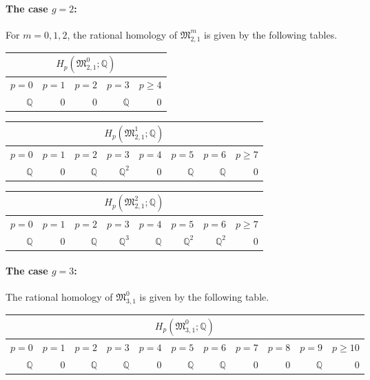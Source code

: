 \paragraph{The case \texorpdfstring{$g=2$}{g=2}:}
For $m = 0,1,2$, the rational homology of $\mathfrak M_{2,1}^m$ is given by the following tables.
\begin{center}
    \begin{tabular}{|r|r|r|r|r|}
        \hline
        \multicolumn{5}{|c|}{$H_p( \mathfrak{M}_{2,1}^0; \mathbb Q )$} \\ \hline
        $p=0$&$p=1$&$p=2$&$p=3$&$p\ge4$\\ \hline \hline
        $\mathbb Q$&$0$&$0$&$\mathbb Q$&$0$\\ \hline
    \end{tabular}
    
    \vspace{2.5ex}
    
    \begin{tabular}{|r|r|r|r|r|r|r|r|}
        \hline
        \multicolumn{8}{|c|}{$H_p( \mathfrak{M}_{2,1}^1; \mathbb Q )$} \\ \hline
        $p=0$&$p=1$&$p=2$&$p=3$&$p=4$&$p=5$&$p=6$&$p\ge7$\\ \hline \hline
        $\mathbb Q$&$0$&$\mathbb Q$&$\mathbb Q^2$&$0$&$\mathbb Q$&$\mathbb Q$&$0$\\ \hline
    \end{tabular}
    
    \vspace{2.5ex}
    
    \begin{tabular}{|r|r|r|r|r|r|r|r|}
        \hline
        \multicolumn{8}{|c|}{$H_p( \mathfrak{M}_{2,1}^2; \mathbb Q )$} \\ \hline
        $p=0$&$p=1$&$p=2$&$p=3$&$p=4$&$p=5$&$p=6$&$p\ge7$\\ \hline \hline
        $\mathbb Q$&$0$&$\mathbb Q$&$\mathbb Q^3$&$\mathbb Q$&$\mathbb Q^2$&$\mathbb Q^2$&$0$\\ \hline
    \end{tabular}
\end{center}

\paragraph{The case \texorpdfstring{$g=3$}{g=3}:}
The rational homology of $\mathfrak M_{3,1}^0$ is given by the following table.
\begin{center}
    \begin{tabular}{|r|r|r|r|r|r|r|r|r|r|r|}
        \hline
        \multicolumn{11}{|c|}{$H_p( \mathfrak{M}_{3,1}^0; \mathbb Q )$} \\ \hline
        $p=0$&$p=1$&$p=2$&$p=3$&$p=4$&$p=5$&$p=6$&$p=7$&$p=8$&$p=9$&$p\ge10$\\ \hline \hline
        $\mathbb Q$&$0$&$\mathbb Q$&$\mathbb Q$&$0$&$\mathbb Q$&$\mathbb Q$&$0$&$0$&$\mathbb Q$&$0$\\ \hline
    \end{tabular}
\end{center}
